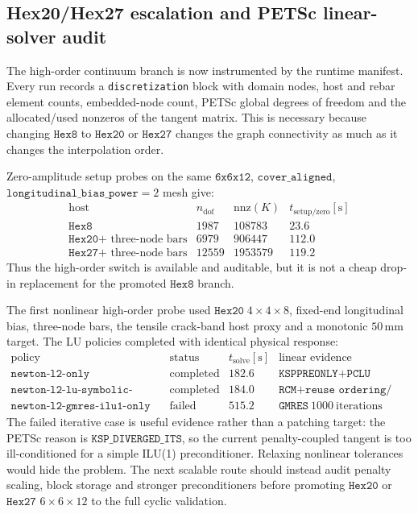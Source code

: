 \subsection{Hex20/Hex27 escalation and PETSc linear-solver audit}

The high-order continuum branch is now instrumented by the runtime manifest.
Every run records a \texttt{discretization} block with domain nodes, host and
rebar element counts, embedded-node count, PETSc global degrees of freedom and
the allocated/used nonzeros of the tangent matrix. This is necessary because
changing \(\texttt{Hex8}\) to \(\texttt{Hex20}\) or \(\texttt{Hex27}\) changes
the graph connectivity as much as it changes the interpolation order.

Zero-amplitude setup probes on the same
\(\texttt{6x6x12}\), \(\texttt{cover\_aligned}\),
\(\texttt{longitudinal\_bias\_power}=2\) mesh give:
\[
\begin{array}{l|r|r|r}
\text{host} & n_{\mathrm{dof}} & \mathrm{nnz}(K) &
t_{\mathrm{setup/zero}}[\mathrm{s}]\\
\hline
\texttt{Hex8} & 1987 & 108783 & 23.6\\
\texttt{Hex20}+\text{ three-node bars} & 6979 & 906447 & 112.0\\
\texttt{Hex27}+\text{ three-node bars} & 12559 & 1953579 & 119.2
\end{array}
\]
Thus the high-order switch is available and auditable, but it is not a cheap
drop-in replacement for the promoted \(\texttt{Hex8}\) branch.

The first nonlinear high-order probe used
\(\texttt{Hex20}\;4\times4\times8\), fixed-end longitudinal bias, three-node
bars, the tensile crack-band host proxy and a monotonic
\(50\,\mathrm{mm}\) target. The LU policies completed with identical physical
response:
\[
\begin{array}{l|c|c|c}
\text{policy} & \text{status} & t_{\mathrm{solve}}[\mathrm{s}] &
\text{linear evidence}\\
\hline
\texttt{newton-l2-only} & \text{completed} & 182.6 &
\texttt{KSPPREONLY+PCLU}\\
\texttt{newton-l2-lu-symbolic-reuse-only} & \text{completed} & 184.0 &
\texttt{RCM+reuse ordering/fill}\\
\texttt{newton-l2-gmres-ilu1-only} & \text{failed} & 515.2 &
\texttt{GMRES}~1000~\text{iterations}
\end{array}
\]
The failed iterative case is useful evidence rather than a patching target:
the PETSc reason is \(\texttt{KSP\_DIVERGED\_ITS}\), so the current
penalty-coupled tangent is too ill-conditioned for a simple ILU(1)
preconditioner. Relaxing nonlinear tolerances would hide the problem. The next
scalable route should instead audit penalty scaling, block storage and stronger
preconditioners before promoting \(\texttt{Hex20}\) or \(\texttt{Hex27}\)
\(6\times6\times12\) to the full cyclic validation.

